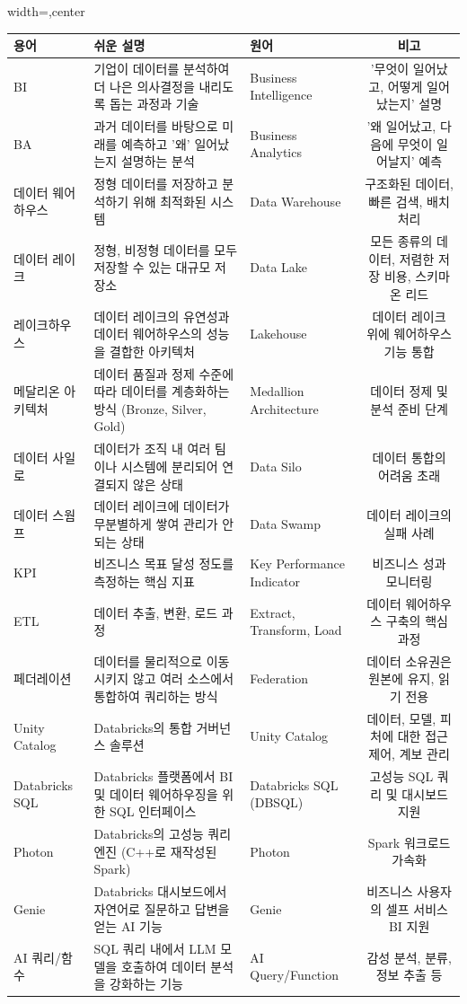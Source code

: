 \documentclass[11pt,a4paper]{article}
\begin{document}
\begin{adjustbox}{width=\textwidth,center}
\begin{tabular}{lllc}
\toprule
\textbf{용어} & \textbf{쉬운 설명} & \textbf{원어} & \textbf{비고} \\
\midrule
BI & 기업이 데이터를 분석하여 더 나은 의사결정을 내리도록 돕는 과정과 기술 & Business Intelligence & '무엇이 일어났고, 어떻게 일어났는지' 설명 \\
BA & 과거 데이터를 바탕으로 미래를 예측하고 '왜' 일어났는지 설명하는 분석 & Business Analytics & '왜 일어났고, 다음에 무엇이 일어날지' 예측 \\
데이터 웨어하우스 & 정형 데이터를 저장하고 분석하기 위해 최적화된 시스템 & Data Warehouse & 구조화된 데이터, 빠른 검색, 배치 처리 \\
데이터 레이크 & 정형, 비정형 데이터를 모두 저장할 수 있는 대규모 저장소 & Data Lake & 모든 종류의 데이터, 저렴한 저장 비용, 스키마 온 리드 \\
레이크하우스 & 데이터 레이크의 유연성과 데이터 웨어하우스의 성능을 결합한 아키텍처 & Lakehouse & 데이터 레이크 위에 웨어하우스 기능 통합 \\
메달리온 아키텍처 & 데이터 품질과 정제 수준에 따라 데이터를 계층화하는 방식 (Bronze, Silver, Gold) & Medallion Architecture & 데이터 정제 및 분석 준비 단계 \\
데이터 사일로 & 데이터가 조직 내 여러 팀이나 시스템에 분리되어 연결되지 않은 상태 & Data Silo & 데이터 통합의 어려움 초래 \\
데이터 스웜프 & 데이터 레이크에 데이터가 무분별하게 쌓여 관리가 안 되는 상태 & Data Swamp & 데이터 레이크의 실패 사례 \\
KPI & 비즈니스 목표 달성 정도를 측정하는 핵심 지표 & Key Performance Indicator & 비즈니스 성과 모니터링 \\
ETL & 데이터 추출, 변환, 로드 과정 & Extract, Transform, Load & 데이터 웨어하우스 구축의 핵심 과정 \\
페더레이션 & 데이터를 물리적으로 이동시키지 않고 여러 소스에서 통합하여 쿼리하는 방식 & Federation & 데이터 소유권은 원본에 유지, 읽기 전용 \\
Unity Catalog & Databricks의 통합 거버넌스 솔루션 & Unity Catalog & 데이터, 모델, 피처에 대한 접근 제어, 계보 관리 \\
Databricks SQL & Databricks 플랫폼에서 BI 및 데이터 웨어하우징을 위한 SQL 인터페이스 & Databricks SQL (DBSQL) & 고성능 SQL 쿼리 및 대시보드 지원 \\
Photon & Databricks의 고성능 쿼리 엔진 (C++로 재작성된 Spark) & Photon & Spark 워크로드 가속화 \\
Genie & Databricks 대시보드에서 자연어로 질문하고 답변을 얻는 AI 기능 & Genie & 비즈니스 사용자의 셀프 서비스 BI 지원 \\
AI 쿼리/함수 & SQL 쿼리 내에서 LLM 모델을 호출하여 데이터 분석을 강화하는 기능 & AI Query/Function & 감성 분석, 분류, 정보 추출 등 \\
\bottomrule
\end{tabular}
\end{adjustbox}
\end{document}

